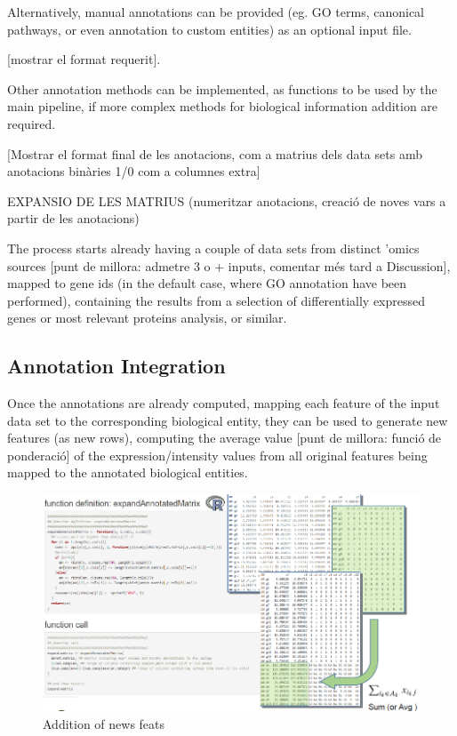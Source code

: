 \documentclass[a4paper, nobind]{templates/ociamthesis}
\begin{document}
Alternatively, manual annotations can be provided (eg. GO terms, canonical pathways, or even annotation to custom entities) as an optional input file.

{[}mostrar el format requerit{]}.

Other annotation methods can be implemented, as functions to be used by the main pipeline, if more complex methods for biological information addition are required.

{[}Mostrar el format final de les anotacions, com a matrius dels data sets amb anotacions binàries 1/0 com a columnes extra{]}

EXPANSIO DE LES MATRIUS (numeritzar anotacions, creació de noves vars a partir de les anotacions)

The process starts already having a couple of data sets from distinct 'omics sources {[}punt de millora: admetre 3 o + inputs, comentar més tard a Discussion{]}, mapped to gene ids (in the default case, where GO annotation have been performed), containing the results from a selection of differentially expressed genes or most relevant proteins analysis, or similar.

\clearpage

\hypertarget{biointegration}{%
\subsection{Annotation Integration}\label{biointegration}}

Once the annotations are already computed, mapping each feature of the input data set to the corresponding biological entity, they can be used to generate new features (as new rows), computing the average value {[}punt de millora: funció de ponderació{]} of the expression/intensity values from all original features being mapped to the annotated biological entities.

\begin{figure}

{\centering \includegraphics[width=0.95\linewidth]{figures/chapter3/3-2_addition_of_new_feats} 

}

\caption{Addition of news feats}\label{fig:fig3-2}
\end{figure}
\end{document}
